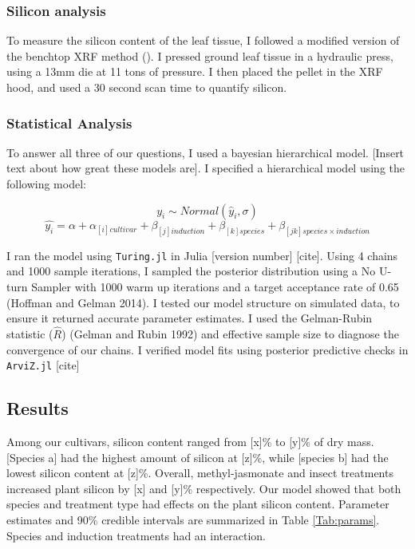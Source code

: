 \documentclass[12pt, letterpaper, ]{article}
\begin{document}
\subsubsection{Silicon analysis}

To measure the silicon content of the leaf tissue, I followed a modified version of the benchtop XRF method (\cite{reidinger_rapid_2012}). I pressed ground leaf tissue in a hydraulic press, using a 13mm die at 11 tons of pressure. I then placed the pellet in the XRF hood, and used a 30 second scan time to quantify silicon. 

\subsubsection{Statistical Analysis}

To answer all three of our questions, I used a bayesian hierarchical model. [Insert text about how great these models are]. I specified a hierarchical model using the following model:

\[y_i \sim Normal(\hat{y}_i, \sigma)\]
\[\hat{y_i} = \alpha + \alpha_{[i]cultivar} + \beta_{[j]induction} + \beta_{[k]species} + \beta_{[jk]species \times induction}\]

I ran the model using \verb|Turing.jl| in Julia [version number] [cite]. Using 4 chains and 1000 sample iterations, I sampled the posterior distribution using a No U-turn Sampler with 1000 warm up iterations and a target acceptance rate of 0.65 (Hoffman and Gelman 2014). I tested our model structure on simulated data, to ensure it returned accurate parameter estimates. I used the Gelman-Rubin statistic (\( \hat{R} \)) (Gelman and Rubin 1992) and effective sample size to diagnose the convergence of our chains. I verified model fits using posterior predictive checks in \verb|ArviZ.jl| [cite] 

\subsection{Results}

Among our cultivars, silicon content ranged from [x]\% to [y]\% of dry mass. [Species a] had the highest amount of silicon at [z]\%, while [species b] had the lowest silicon content at [z]\%. Overall, methyl-jasmonate and insect treatments increased plant silicon by [x] and [y]\% respectively. Our model showed that both species and treatment type had effects on the plant silicon content. Parameter estimates and 90\% credible intervals are summarized in Table \ref{Tab:params}. Species and induction treatments had an interaction. 
\end{document}

